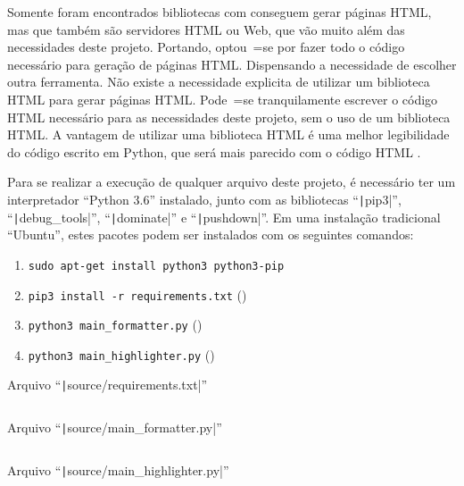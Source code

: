 Somente foram encontrados bibliotecas com  conseguem gerar páginas HTML,
mas que também são servidores HTML ou
Web,
que vão muito além das necessidades deste projeto.
Portando,
optou~=se por fazer todo o código necessário para geração de páginas HTML.
Dispensando a necessidade de escolher outra ferramenta.
Não existe a necessidade explicita de utilizar um biblioteca HTML para gerar páginas HTML.
Pode~=se tranquilamente escrever o código HTML necessário para as necessidades deste projeto,
sem o uso de um biblioteca HTML.
A vantagem de utilizar uma biblioteca HTML é uma melhor legibilidade do código escrito em Python,
que será mais parecido com o código HTML \cite{webDevelopmentWithDjango}.

Para se realizar a execução de qualquer arquivo deste projeto,
é necessário ter um interpretador ``Python 3.6'' instalado,
junto com as bibliotecas ``\texttt|pip3|'',
``\texttt|debug_tools|'', ``\texttt|dominate|'' e
``\texttt|pushdown|''.
Em uma instalação tradicional ``Ubuntu'',
estes pacotes podem ser instalados com os seguintes comandos:
\begin{enumerate}[1)]
\item \texttt{sudo apt-get install python3 python3-pip}
\item \texttt{pip3 install -r requirements.txt} ()
\item \texttt{python3 main_formatter.py} ()
\item \texttt{python3 main_highlighter.py} ()
\end{enumerate}

\begin{code}
\caption{Arquivo ``\texttt|source/requirements.txt|''}
\label{code:requirementsTxt}
\inputminted{python3}{../source/requirements.txt}
\end{code}

\begin{code}
\caption{Arquivo ``\texttt|source/main_formatter.py|''}
\label{code:MainFormatterPy}
\inputminted[firstline=39,firstnumber=1]{python3}{../source/main_formatter.py}
\end{code}

\begin{code}
\caption{Arquivo ``\texttt|source/main_highlighter.py|''}
\label{code:MainHighlighterPy}
\inputminted[firstline=39,firstnumber=1]{python3}{../source/main_highlighter.py}
\end{code}

